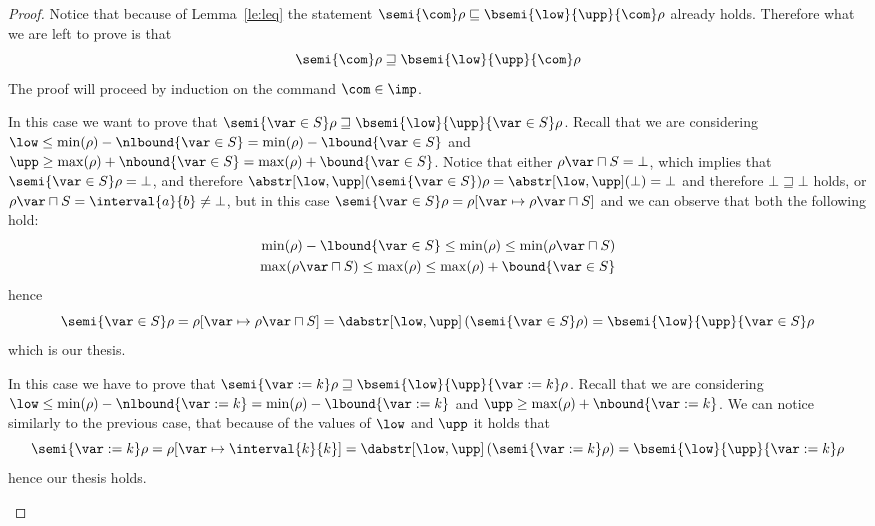 \begin{proof}
  Notice that because of Lemma~\ref{le:leq} the statement
  \({\semi{\com}\rho} \sqsubseteq {\bsemi{\low}{\upp}{\com}\rho}\)
  already holds. Therefore what we are left to prove is that
  \begin{equation*}
    \semi{\com}\rho \sqsupseteq \bsemi{\low}{\upp}{\com}\rho
  \end{equation*}
  The proof will proceed by induction on the command \(\com\in\imp\).
  \begin{inductive}
     In this case we want to prove that
    \({\semi{\var\in S}\rho \sqsupseteq
      \bsemi{\low}{\upp}{\var\in S}\rho}\). Recall that we are
    considering
    \({\low \leq \min(\rho) - \nlbound{\var\in S}} = {\min(\rho) -
      \lbound{\var\in S}}\) and
    \({\upp \geq \max(\rho) + \nbound{\var\in S}} = {\max(\rho) +
      \bound{\var\in S}}\). Notice that either
    \(\rho\var \sqcap S = \bot\), which implies that
    \(\semi{\var\in S}\rho = \bot\), and therefore
    \({\abstr[\low,\upp](\semi{\var\in S})\rho} =
    \abstr[\low,\upp](\bot) = \bot\) and therefore
    \(\bot \sqsupseteq \bot\) holds, or
    \(\rho\var \sqcap S = \interval{a}{b} \neq \bot\), but in this
    case
    \({\semi{\var\in S}\rho} = {\rho[\var \mapsto \rho\var
      \sqcap S]}\) and we can observe that both the following hold:
    \begin{align*}
      \min(\rho) - \lbound{\var\in S} \leq \min(\rho) \leq \min(\rho\var \sqcap S) \\
      \max(\rho\var \sqcap S) \leq \max(\rho) \leq \max(\rho) + \bound{\var\in S}
    \end{align*}
    hence
    \begin{equation*}
      \semi{\var\in S}\rho = \rho[\var \mapsto \rho\var \sqcap S] = \dabstr[\low,\upp]\left(\semi{\var\in S}\rho\right) = \bsemi{\low}{\upp}{\var\in S}\rho
    \end{equation*}
    which is our thesis.
    
     In this case we have to prove that
    \(\semi{\var := k}\rho \sqsupseteq
    \bsemi{\low}{\upp}{\var := k}\rho\). Recall that we are
    considering
    \({\low \leq \min(\rho) - \nlbound{\var := k}} = {\min(\rho) -
      \lbound{\var := k}}\) and
    \({\upp \geq \max(\rho) + \nbound{\var := k}}\).  We can notice
    similarly to the previous case, that because of the values of
    \(\low\) and \(\upp\) it holds that
    \begin{equation*}
      \semi{\var := k}\rho = \rho[\var \mapsto \interval{k}{k}] = \dabstr[\low,\upp]\left(\semi{\var := k}\rho\right) = \bsemi{\low}{\upp}{\var := k}\rho
    \end{equation*}
    hence our thesis holds.
    

\end{inductive}
\end{proof}
